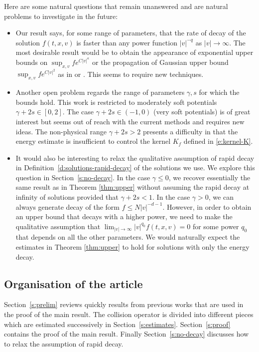 \documentclass[11pt]{article}
\theoremstyle{plain}
\theoremstyle{definition}
\numberwithin{equation}{section}
\let\A N
\begin{document}
Here are some natural questions that remain unanswered and are natural
problems to investigate in the future:
\begin{itemize}
\item Our result says, for some range of parameters, that the rate of
decay of the solution $f(t,x,v)$ is faster than any power function
$|v|^{-q}$ as $|v| \to \infty$. The most desirable result would be
to obtain the appearance of exponential upper bounds on
$\sup_{x,v} f e^{C|v|^\kappa}$ or the propagation of Gaussian upper
bound $\sup_{x,v} f e^{C |v|^2}$ as in
\cite{gamba-panferov-villani-2009} or \cite{css}. This seems to
require new techniques.
\item Another open problem regards the range of parameters $\gamma,s$
for which the bounds hold. This work is restricted to moderately
soft potentials $\gamma+2s \in [0,2]$. The case
$\gamma+2s \in (-1,0)$ (very soft potentials) is of great interest
but seems out of reach with the current methods and requires new
ideas. The non-physical range $\gamma+2s > 2$ presents a difficulty
in that the energy estimate is insufficient to control the kernel
$K_f$ defined in \eqref{e:kernel-K}.
\item It would also be interesting to relax the qualitative assumption
of rapid decay in Definition~\ref{d:solutions-rapid-decay} of the
solutions we use. We explore this question in
Section~\ref{s:no-decay}. In the case $\gamma \leq 0$, we recover
essentially the same result as in Theorem \ref{thm:upper} without
assuming the rapid decay at infinity of solutions provided that
$\gamma+2s < 1$. In the case $\gamma > 0$, we can always generate
decay of the form $f \leq \A |v|^{-d-1}$. However, in order to
obtain an upper bound that decays with a higher power, we need to
make the qualitative assumption that
$\lim_{|v| \to \infty} |v|^{q_0} f(t,x,v) = 0$ for some power $q_0$
that depends on all the other parameters. We would naturally expect
the estimates in Theorem \ref{thm:upper} to hold for solutions with
only the energy decay.
\end{itemize}

\subsection{Organisation of the article}
Section~\ref{s:prelim} reviews quickly results from previous works
that are used in the proof of the main result. The collision operator
is divided into different pieces which are estimated successively in
Section~\ref{s:estimates}. Section~\ref{s:proof} contains the proof of
the main result. Finally Section~\ref{s:no-decay} discusses how to
relax the assumption of rapid decay.
\end{document}
